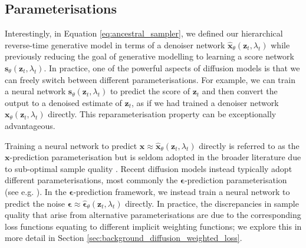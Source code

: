 \documentclass[ oneside,%
                    author={George Herbert},
                    degree={MSci},
                     title={Diffusion Models for Time-Evolving Precipitation Fields},
                  subtitle={}]{dissertation}
\begin{document}
\subsection{Parameterisations}
\label{sec:background_diffusion_parameterisations}

Interestingly, in Equation \ref{eq:ancestral_sampler}, we defined our hierarchical reverse-time generative model in terms of a denoiser network $\hat{\mathbf{x}}_\theta(\mathbf{z}_t, \lambda_t)$ while previously reducing the goal of generative modelling to learning a score network $\mathbf{s}_\theta(\mathbf{z}_t,\lambda_t)$. In practice, one of the powerful aspects of diffusion models is that we can freely switch between different parameterisations. For example, we can train a neural network $\mathbf{s}_\theta(\mathbf{z}_t, \lambda_t)$ to predict the score of $\mathbf{z}_t$ and then convert the output to a denoised estimate of $\mathbf{z}_t$, as if we had trained a denoiser network $\mathbf{x}_\theta(\mathbf{z}_t, \lambda_t)$ directly. This reparameterisation property can be exceptionally advantageous.

Training a neural network to predict $\mathbf{x}\approx\hat{\mathbf{x}}_\theta(\mathbf{z}_t, \lambda_t)$ directly is referred to as the $\mathbf{x}$-prediction parameterisation but is seldom adopted in the broader literature due to sub-optimal sample quality \cite{DDPM_Ho}. Recent diffusion models instead typically adopt different parameterisations, most commonly the $\boldsymbol\epsilon$-prediction parameterisation (see e.g. \cite{DDPM_Ho, Cascaded_Ho, Imagen_Saharia}). In the $\boldsymbol\epsilon$-prediction framework, we instead train a neural network to predict the noise $\boldsymbol\epsilon\approx\hat{\boldsymbol\epsilon}_\theta(\mathbf{z}_t,\lambda_t)$ directly. In practice, the discrepancies in sample quality that arise from alternative parameterisations are due to the corresponding loss functions equating to different implicit weighting functions; we explore this in more detail in Section \ref{sec:background_diffusion_weighted_loss}.
\end{document}

